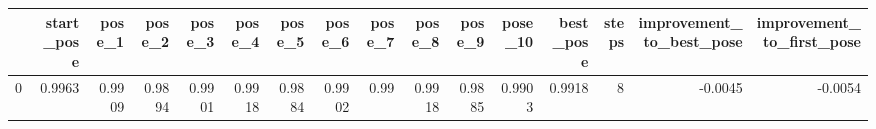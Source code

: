 \begin{tabular}{lrrrrrrrrrrrrrrr}
\toprule
{} &  start\_pose &  pose\_1 &  pose\_2 &  pose\_3 &  pose\_4 &  pose\_5 &  pose\_6 &  pose\_7 &  pose\_8 &  pose\_9 &  pose\_10 &  best\_pose &  steps &  improvement\_to\_best\_pose &  improvement\_to\_first\_pose \\
\midrule
0 &      0.9963 &  0.9909 &  0.9894 &  0.9901 &  0.9918 &  0.9884 &  0.9902 &    0.99 &  0.9918 &  0.9885 &   0.9903 &     0.9918 &      8 &                   -0.0045 &                    -0.0054 \\
\bottomrule
\end{tabular}
